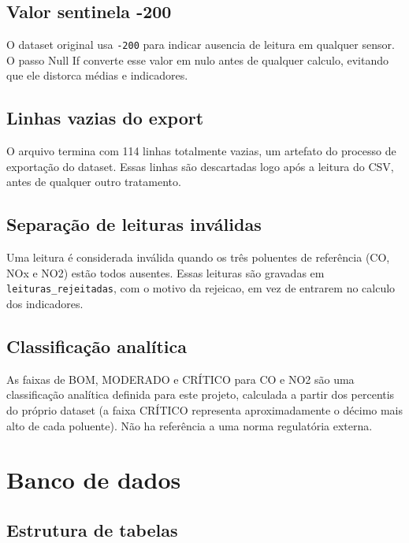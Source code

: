 \documentclass[12pt,a4paper,openany]{report}
\begin{document}
\section{Valor sentinela -200}

O dataset original usa \texttt{-200} para indicar ausencia de leitura em
qualquer sensor. O passo Null If converte esse valor em nulo antes de
qualquer calculo, evitando que ele distorca médias e indicadores.

\section{Linhas vazias do export}

O arquivo termina com 114 linhas totalmente vazias, um artefato do processo
de exportação do dataset. Essas linhas são descartadas logo após a leitura do
CSV, antes de qualquer outro tratamento.

\section{Separação de leituras inválidas}

Uma leitura é considerada inválida quando os três poluentes de referência
(CO, NOx e NO2) estão todos ausentes. Essas leituras são gravadas em
\texttt{leituras\_rejeitadas}, com o motivo da rejeicao, em vez de entrarem no
calculo dos indicadores.

\section{Classificação analítica}

As faixas de BOM, MODERADO e CRÍTICO para CO e NO2 são uma classificação
analítica definida para este projeto, calculada a partir dos percentis do
próprio dataset (a faixa CRÍTICO representa aproximadamente o décimo mais
alto de cada poluente). Não ha referência a uma norma regulatória externa.

\chapter{Banco de dados}

\section{Estrutura de tabelas}
\end{document}
